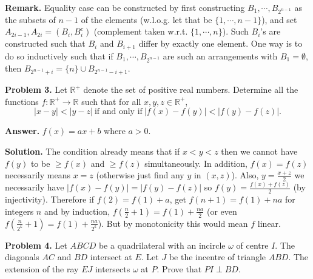 \documentclass[11pt,a4paper]{article}
\begin{document}
	\textbf{Remark.} 
	Equality case can be constructed by first constructing $B_1, \cdots, B_{2^{n-1}}$ as the subsets of $n - 1$ of the elements (w.l.o.g. let that be $\{1, \cdots, n - 1\}$), 
	and set $A_{2i-1}, A_{2i} = (B_i, B_{i}^c)$ (complement taken w.r.t. $\{1, \cdots, n\}$). 
	Such $B_i$'s are constructed such that $B_i$ and $B_{i+1}$ differ by exactly one element. 
	One way is to do so inductively such that if $B_1, \cdots, B_{2^{n-1}}$ are such an arrangements with $B_1 = \emptyset$, 
	then $B_{2^{n-1}+i} = \{n\}\cup B_{2^{n-1} - i + 1}$. 
	
	\textbf{Problem 3.}
	Let $\mathbb{R}^+$ denote the set of positive real numbers. Determine all the functions $f\colon\mathbb{R}^+\to\mathbb{R}$ such that for all $x,y,z\in\mathbb{R}^+$,
	\[
	|x-y|<|y-z|~\text{if and only if}~|f(x)-f(y)|<|f(y)-f(z)|.
	\]
	
	\textbf{Answer.} $f(x)=ax+b$ where $a > 0$. 
	
	\textbf{Solution.}
	The condition already means that if $x<y<z$ then we cannot have $f(y)$ to be $\ge f(x)$ and $\ge f(z)$ simultaneously. 
	In addition, $f(x) = f(z)$ necessarily means $x = z$ (otherwise just find any $y$ in $(x, z)$). 
	Also, $y = \frac{x+z}{2}$ we necessarily have $|f(x)-f(y)|=|f(y)-f(z)|$ so $f(y)=\frac{f(x)+f(z)}{2}$ (by injectivity). 
	Therefore if $f(2)=f(1)+a$, get $f(n+1)=f(1)+na$ for integers $n$ and by induction, $f(\frac{n}{2}+1)=f(1)+\frac{na}{2}$ 
	(or even $f(\frac{n}{2^k}+1)=f(1)+\frac{na}{2^k}$). 
	But by monotonicity this would mean $f$ linear. 
	
	\textbf{Problem 4.}
	Let $ABCD$ be a quadrilateral with an incircle $\omega$ of centre $I$. The diagonals $AC$ and $BD$ intersect at $E$. Let $J$ be the incentre of triangle $ABD$. The extension of the ray $EJ$ intersects $\omega$ at $P$. Prove that $PI\perp BD$.
	
\end{document}
